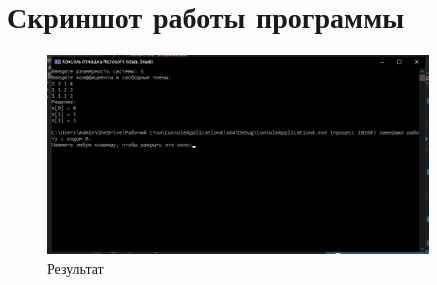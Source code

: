 \documentclass[12pt,a4paper]{scrartcl}
\begin{document}
\section{Скриншот работы программы}
\label{sec:picexample}
\begin{figure}[h]
	\centering
	\includegraphics[width=0.9\textwidth]{pract.png}
	\caption{Результат}\label{fig:par}
\end{figure}
\end{document}
